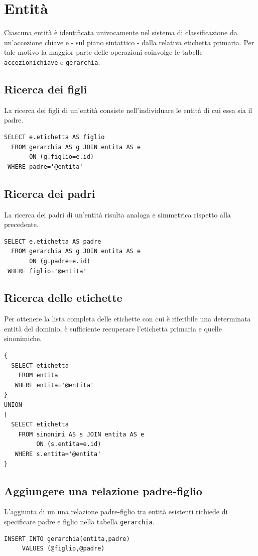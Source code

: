 \documentclass[10pt,a4paper,headinclude,footinclude,hidelinks]{scrreprt} %
\begin{document}
	\section{Entit\`a}
	Ciascuna entità è identificata univocamente nel sistema di classificazione da un'accezione chiave e - sul piano sintattico - dalla relativa etichetta primaria. Per tale motivo la maggior parte delle operazioni coinvolge le tabelle \texttt{accezioni\textunderscore chiave} e \texttt{gerarchia}.
 
	\subsection{Ricerca dei figli}
	La ricerca dei figli di un'entità consiste nell'individuare le entità di cui essa sia il padre.
\begin{verbatim}
SELECT e.etichetta AS figlio
  FROM gerarchia AS g JOIN entita AS e
       ON (g.figlio=e.id)
 WHERE padre='@entita'
\end{verbatim}

	\subsection{Ricerca dei padri}
	La ricerca dei padri di un'entità risulta analoga e simmetrica rispetto alla precedente.
\begin{verbatim}
SELECT e.etichetta AS padre
  FROM gerarchia AS g JOIN entita AS e
       ON (g.padre=e.id)
 WHERE figlio='@entita'
\end{verbatim}

	\subsection{Ricerca delle etichette}
	Per ottenere la lista completa delle etichette con cui è riferibile una determinata entità del dominio, è sufficiente recuperare l'etichetta primaria e quelle sinonimiche.

\begin{verbatim}
{
  SELECT etichetta
    FROM entita
   WHERE entita='@entita'
}
UNION
[
  SELECT etichetta
    FROM sinonimi AS s JOIN entita AS e
         ON (s.entita=e.id)
   WHERE s.entita='@entita'
}
\end{verbatim}

	\subsection{Aggiungere una relazione padre-figlio}
	L'aggiunta di un una relazione padre-figlio tra entità esistenti richiede di specificare padre e figlio nella tabella \texttt{gerarchia}.
\begin{verbatim}
INSERT INTO gerarchia(entita,padre)
     VALUES (@figlio,@padre)
\end{verbatim}
\end{document}
